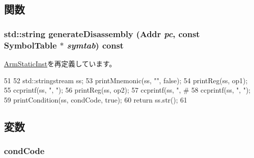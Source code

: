 \subsection{関数}
\hypertarget{classArmISA_1_1FpCondCompRegOp_a95d323a22a5f07e14d6b4c9385a91896}{
\subsubsection[{generateDisassembly}]{\setlength{\rightskip}{0pt plus 5cm}std::string generateDisassembly ({\bf Addr} {\em pc}, \/  const SymbolTable $\ast$ {\em symtab}) const}}
\label{classArmISA_1_1FpCondCompRegOp_a95d323a22a5f07e14d6b4c9385a91896}


\hyperlink{classArmISA_1_1ArmStaticInst_a95d323a22a5f07e14d6b4c9385a91896}{ArmStaticInst}を再定義しています。


\begin{DoxyCode}
51 {
52     std::stringstream ss;
53     printMnemonic(ss, "", false);
54     printReg(ss, op1);
55     ccprintf(ss, ", ");
56     printReg(ss, op2);
57     ccprintf(ss, ", #%
58     ccprintf(ss, ", ");
59     printCondition(ss, condCode, true);
60     return ss.str();
61 }
\end{DoxyCode}


\subsection{変数}
\hypertarget{classArmISA_1_1FpCondCompRegOp_a273dc0fe84de8f4a9cf52aaf8dc27885}{
\subsubsection[{condCode}]{ {\bf condCode}}}
\label{classArmISA_1_1FpCondCompRegOp_a273dc0fe84de8f4a9cf52aaf8dc27885}


